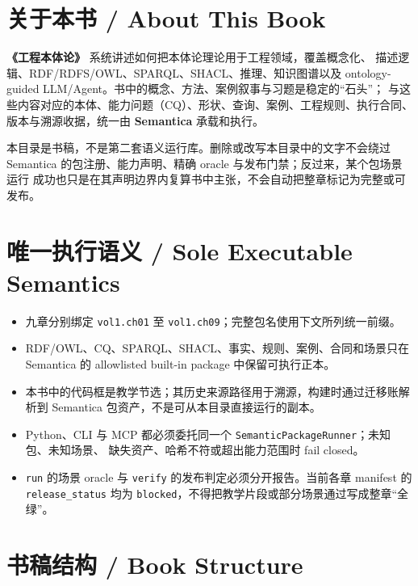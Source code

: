 
\section*{关于本书 / About This Book}

\textbf{《工程本体论》} 系统讲述如何把本体论理论用于工程领域，覆盖概念化、
描述逻辑、RDF/RDFS/OWL、SPARQL、SHACL、推理、知识图谱以及
ontology-guided LLM/Agent。书中的概念、方法、案例叙事与习题是稳定的“石头”；
与这些内容对应的本体、能力问题（CQ）、形状、查询、案例、工程规则、执行合同、
版本与溯源收据，统一由 \textbf{Semantica} 承载和执行。

本目录是书稿，不是第二套语义运行库。删除或改写本目录中的文字不会绕过
Semantica 的包注册、能力声明、精确 oracle 与发布门禁；反过来，某个包场景运行
成功也只是在其声明边界内复算书中主张，不会自动把整章标记为完整或可发布。

\section*{唯一执行语义 / Sole Executable Semantics}

\begin{itemize}
\item 九章分别绑定 \texttt{vol1.ch01} 至 \texttt{vol1.ch09}；完整包名使用下文所列统一前缀。
\item RDF/OWL、CQ、SPARQL、SHACL、事实、规则、案例、合同和场景只在
Semantica 的 allowlisted built-in package 中保留可执行正本。
\item 本书中的代码框是教学节选；其历史来源路径用于溯源，构建时通过迁移账解析到
Semantica 包资产，不是可从本目录直接运行的副本。
\item Python、CLI 与 MCP 都必须委托同一个 \texttt{SemanticPackageRunner}；未知包、未知场景、
缺失资产、哈希不符或超出能力范围时 fail closed。
\item \texttt{run} 的场景 oracle 与 \texttt{verify} 的发布判定必须分开报告。当前各章 manifest 的
\texttt{release\_status} 均为 \texttt{blocked}，不得把教学片段或部分场景通过写成整章“全绿”。
\end{itemize}

\section*{书稿结构 / Book Structure}

